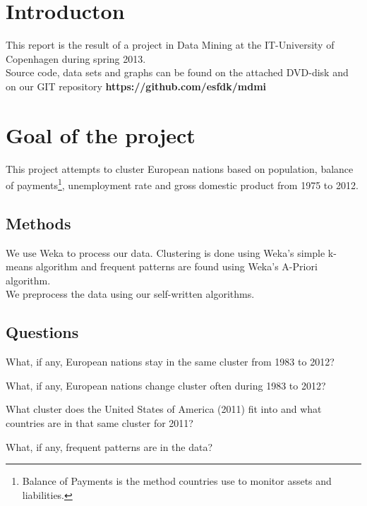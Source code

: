 \section{Introducton}
\label{Intro}
This report is the result of a project in Data Mining at the IT-University of Copenhagen during spring 2013.
\\Source code, data sets and graphs can be found on the attached DVD-disk and on our GIT repository \textbf{https://github.com/esfdk/mdmi}

\section{Goal of the project}
This project attempts to cluster European nations based on population, balance of payments\footnote{Balance of Payments is the method countries use to monitor assets and liabilities.\cite[What Is Balance Of Payments?]{Investopedia}}, unemployment rate and gross domestic product from 1975 to 2012.

\subsection{Methods}
We use Weka to process our data. Clustering is done using Weka's simple k-means algorithm and frequent patterns are found using Weka's A-Priori algorithm.
\\We preprocess the data using our self-written algorithms.

\subsection{Questions}
\label{Intro_que}
\begin{my_itemize}
\item What, if any, European nations stay in the same cluster from 1983 to 2012?
\item What, if any, European nations change cluster often during 1983 to 2012?
\item What cluster does the United States of America (2011) fit into and what countries are in that same cluster for 2011?
\item What, if any, frequent patterns are in the data?
\end{my_itemize}